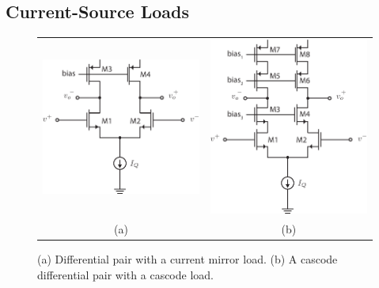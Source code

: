 \subsection{Current-Source Loads}
\begin{figure}[tb]
\begin{center}
\begin{tabular}{cc}
\includegraphics[scale=1]{Diff_mirror_load.pdf} &
\includegraphics[scale=1]{Diff_mirror_cascode.pdf} \\
(a) & (b) \\
\end{tabular}
\end{center}
\caption{(a) Differential pair with a current mirror load.  (b) A cascode differential pair with a cascode load.}
\label{fig:Diff_mirror_load.pdf}
\end{figure}


